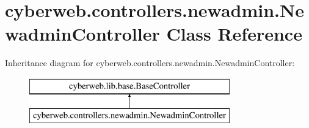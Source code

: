 \hypertarget{classcyberweb_1_1controllers_1_1newadmin_1_1_newadmin_controller}{\section{cyberweb.\-controllers.\-newadmin.\-Newadmin\-Controller \-Class \-Reference}
\label{classcyberweb_1_1controllers_1_1newadmin_1_1_newadmin_controller}
}
\-Inheritance diagram for cyberweb.\-controllers.\-newadmin.\-Newadmin\-Controller\-:\begin{figure}[H]
\begin{center}
\leavevmode
\includegraphics[height=2.000000cm]{classcyberweb_1_1controllers_1_1newadmin_1_1_newadmin_controller}
\end{center}
\end{figure}
